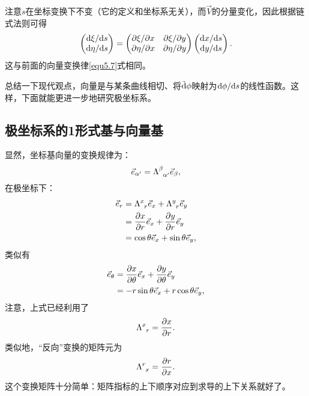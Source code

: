 注意$s$在坐标变换下不变（它的定义和坐标系无关），而$\vec{V}$的分量变化，因此根据链式法则可得
\begin{equation}
    \begin{pmatrix}
        \mathrm{d} \xi / \mathrm{d} s \\
        \mathrm{d} \eta / \mathrm{d} s
    \end{pmatrix}
    =
    \begin{pmatrix}
        \partial \xi / \partial x & \partial \xi / \partial y \\
        \partial \eta / \partial x & \partial \eta / \partial y
    \end{pmatrix}
    \begin{pmatrix}
        \mathrm{d} x / \mathrm{d} s \\
        \mathrm{d} y / \mathrm{d} s
    \end{pmatrix}.
\label{equ5.20}
\end{equation}
这与前面的向量变换律\eqref{equ5.7}式相同。

总结一下现代观点，向量是与某条曲线相切、将$\tilde{\mathrm{d}} \phi$映射为$\mathrm{d} \phi / \mathrm{d} s$的线性函数。这样，下面就能更进一步地研究极坐标系。

\subsection*{极坐标系的1形式基与向量基}
显然，坐标基向量的变换规律为：
\begin{equation*}
    \vec{e}_{\alpha'} = \Lambda\indices{^\beta_{\alpha'}} \vec{e}_\beta,
\end{equation*}
在极坐标下：
\begin{align}
    \vec{e}_r &= \Lambda\indices{^x_r} \Ve_x + \Lambda\indices{^y_r} \Ve_y \label{equ5.21} \\
    &= \frac{\partial x}{\partial r} \Ve_x + \frac{\partial y}{\partial r} \Ve_y \notag \\
    &= \cos \theta \Ve_x + \sin \theta \Ve_y, \label{equ5.22}
\end{align}
类似有
\begin{align}
    \vec{e}_\theta &= \frac{\partial x}{\partial \theta} \vec{e}_x + \frac{\partial y}{\partial \theta} \vec{e}_y \notag \\
    &= -r \sin \theta \vec{e}_x + r \cos \theta \vec{e}_y, \label{equ5.23}
\end{align}
注意，上式已经利用了
\begin{equation}
    \Lambda\indices{^x_r} = \frac{\partial x}{\partial r}.
\label{equ5.24}
\end{equation}
类似地，“反向”变换的矩阵元为
\begin{equation}
    \Lambda\indices{^r_x} = \frac{\partial r}{\partial x}.
\label{equ5.25}
\end{equation}
这个变换矩阵十分简单：矩阵指标的上下顺序对应到求导的上下关系就好了。

